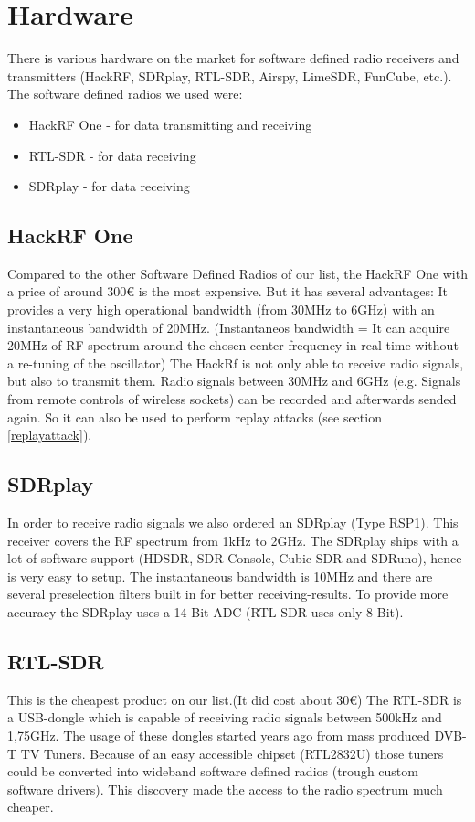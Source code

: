 \documentclass[conference]{IEEEtran}
\begin{document}
\section{Hardware}
There is various hardware on the market for software defined radio receivers and transmitters (HackRF, SDRplay, RTL-SDR, Airspy, LimeSDR, FunCube, etc.). The software defined radios we used were:
\begin{itemize}
	\item HackRF One - for data transmitting and receiving
	\item RTL-SDR - for data receiving
	\item SDRplay - for data receiving
\end{itemize}

\subsection{HackRF One}
Compared to the other Software Defined Radios of our list, the HackRF One with a price of around 300€ is the most expensive. But it has several advantages: It provides a very high operational bandwidth (from 30MHz to 6GHz) with an instantaneous bandwidth of 20MHz. (Instantaneos bandwidth = It can acquire 20MHz of RF spectrum around the chosen center frequency in real-time without a re-tuning of the oscillator) \cite[Chap. 2.5]{Mishra2014} The HackRf is not only able to receive radio signals, but also to transmit them. Radio signals between 30MHz and 6GHz (e.g. Signals from remote controls of wireless sockets) can be recorded and afterwards sended again. So it can also be used to perform replay attacks (see section \ref{replayattack}).  \\

\subsection{SDRplay}
In order to receive radio signals we also ordered an SDRplay (Type RSP1). This receiver covers the RF spectrum from 1kHz to 2GHz. The SDRplay ships with  a lot of software support (HDSDR, SDR Console, Cubic SDR and SDRuno), hence is very easy to setup. The instantaneous bandwidth is 10MHz and there are several preselection filters built in for better receiving-results. To provide more accuracy the SDRplay uses a 14-Bit ADC (RTL-SDR uses only 8-Bit).
\cite{sdrplay}
\\
\subsection{RTL-SDR}
This is the cheapest product on our list.(It did cost about 30€) The RTL-SDR is a USB-dongle which is capable of receiving radio signals  between 500kHz and 1,75GHz.  The  usage of these dongles started years ago from mass produced DVB-T TV Tuners. Because of an easy accessible chipset (RTL2832U) those tuners could be converted into wideband software defined radios (trough custom software drivers). This discovery made the access to the radio spectrum much cheaper. \cite{rtl-sdr}
\end{document}
